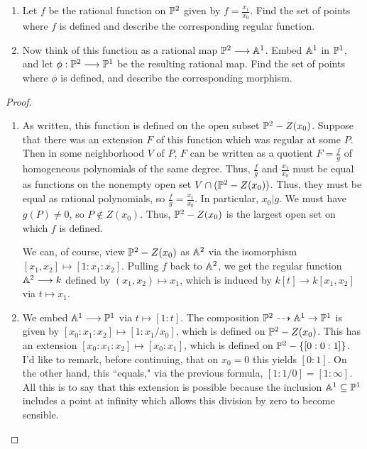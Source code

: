\label{1.4.3}

\begin{enumerate}[label = (\alph*)]
    \item Let $f$ be the rational function on $\P^2$ given by $f = \frac{x_1}{x_0}$. Find the set of points where $f$ is defined and describe the corresponding regular function.

    \item Now think of this function as a rational map $\P^2 \longrightarrow \A^1$. Embed $\A^1$ in $\P^1$, and let $\phi: \P^2 \longrightarrow \P^1$ be the resulting rational map. Find the set of points where $\phi$ is defined, and describe the corresponding morphism.
\end{enumerate}

\begin{proof}
    \begin{enumerate}[label = (\alph*)]
        \item As written, this function is defined on the open subset $\P^2 - Z(x_0)$. Suppose that there was an extension $F$ of this function which was regular at some $P$. Then in some neighborhood $V$ of $P$, $F$ can be written as a quotient $F = \frac{f}{g}$ of homogeneous polynomials of the same degree. Thus, $\frac{f}{g}$ and $\frac{x_1}{x_0}$ must be equal as functions on the nonempty open set $V \cap (\P^2 - Z(x_0))$. Thus, they must be equal as rational polynomials, so $\frac{f}{g} = \frac{x_1}{x_0}$. In particular, $x_0 | g$. We must have $g(P) \neq 0$, so $P \notin Z(x_0)$. Thus, $\P^2 - Z(x_0)$ is the largest open set on which $f$ is defined.

        We can, of course, view $\P^2 - Z(x_0)$ as $\A^2$ via the isomorphism $[x_1, x_2] \mapsto [1: x_1 : x_2]$. Pulling $f$ back to $\A^2$, we get the regular function $\A^2 \longrightarrow k$ defined by $(x_1, x_2) \mapsto x_1$, which is induced by $k[t] \longrightarrow k[x_1, x_2]$ via $t \mapsto x_1$.

        \item We embed $\A^1 \longrightarrow \P^1$ via $t \mapsto [1 : t]$. The composition $\P^2 \dashrightarrow \A^1 \rightarrow \P^1$ is given by $[x_0 : x_1 : x_2] \mapsto [1 : x_1/x_0]$, which is defined on $\P^2 - Z(x_0)$. This has an extension $[x_0 : x_1 : x_2] \mapsto [x_0 : x_1]$, which is defined on $\P^2 - \{[0 : 0 : 1]\}$. I'd like to remark, before continuing, that on $x_0 = 0$ this yields $[0 : 1]$. On the other hand, this ``equals," via the previous formula, $[1 : 1/0] = [1 : \infty]$. All this is to say that this extension is possible because the inclusion $\A^1 \subseteq \P^1$ includes a point at infinity which allows this division by zero to become sensible.


\end{enumerate}
\end{proof}
